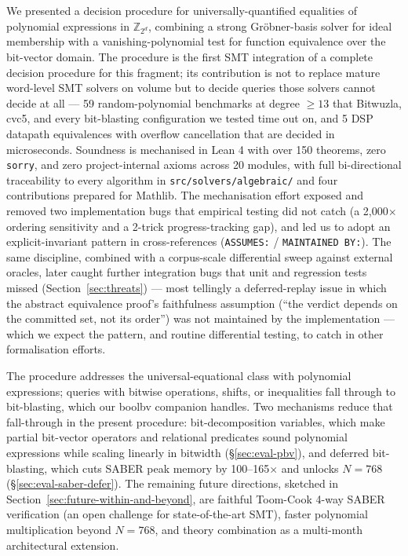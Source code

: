 \documentclass[runningheads]{llncs}
\begin{document}
We presented a decision procedure for universally-quantified
equalities of polynomial expressions in $\mathbb{Z}_{2^d}$,
combining a strong Gr\"obner-basis solver for ideal membership
with a vanishing-polynomial test for function equivalence over
the bit-vector domain. The procedure is the first SMT integration
of a complete decision procedure for this fragment; its
contribution is not to replace mature word-level SMT solvers on
volume but to decide queries those solvers cannot decide at all
--- 59 random-polynomial benchmarks at degree $\geq 13$ that
Bitwuzla, cvc5, and every bit-blasting configuration we tested
time out on, and 5 DSP datapath equivalences with overflow
cancellation that are decided in microseconds. Soundness is
mechanised in Lean 4 with over 150 theorems, zero \texttt{sorry},
and zero project-internal axioms across 20 modules, with full
bi-directional traceability to every algorithm in
\texttt{src/solvers/algebraic/} and four contributions prepared
for Mathlib. The mechanisation effort
exposed and removed two implementation bugs that empirical
testing did not catch (a 2{,}000$\times$ ordering sensitivity
and a 2-trick progress-tracking gap), and led us to adopt an
explicit-invariant pattern in cross-references
(\texttt{ASSUMES:} / \texttt{MAINTAINED BY:}). The same
discipline, combined with a corpus-scale differential sweep
against external oracles, later caught further integration bugs
that unit and regression tests missed (Section~\ref{sec:threats})
--- most tellingly a deferred-replay issue in
which the abstract equivalence proof's faithfulness assumption
(``the verdict depends on the committed set, not its order'') was
not maintained by the implementation --- which we expect the
pattern, and routine differential testing, to catch in other
formalisation efforts.

The procedure addresses the universal-equational class with
polynomial expressions; queries with bitwise operations, shifts,
or inequalities fall through to bit-blasting, which our
boolbv companion handles. Two mechanisms reduce that fall-through
in the present procedure: bit-decomposition variables, which
make partial bit-vector operators and relational predicates
sound polynomial expressions while scaling linearly in
bitwidth (\S\ref{sec:eval-pbv}), and deferred bit-blasting,
which cuts SABER peak memory by 100--165$\times$ and unlocks
$N = 768$ (\S\ref{sec:eval-saber-defer}). The remaining future
directions, sketched in Section~\ref{sec:future-within-and-beyond},
are faithful Toom-Cook 4-way SABER verification (an open
challenge for state-of-the-art SMT), faster polynomial
multiplication beyond $N = 768$, and theory combination as a
multi-month architectural extension.
\end{document}
